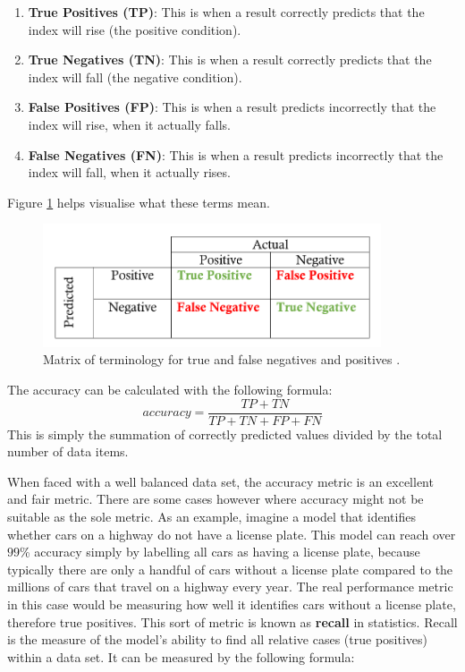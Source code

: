 \documentclass{UoYCSproject}
\begin{document}
\begin{enumerate}
    \item \textbf{True Positives (TP)}: This is when a result correctly predicts that the index will rise (the positive condition).
    \item \textbf{True Negatives (TN)}: This is when a result correctly predicts that the index will fall (the negative condition).
    \item \textbf{False Positives (FP)}: This is when a result predicts incorrectly that the index will rise, when it actually falls.
    \item \textbf{False Negatives (FN)}: This is when a result predicts incorrectly that the index will fall, when it actually rises.
\end{enumerate}

Figure \ref{fig:tptnfpfn} helps visualise what these terms mean.

\begin{figure}[h]
\includegraphics[width=10cm]{tptnfpfn.png}
\centering
\caption{Matrix of terminology for true and false negatives and positives \cite{precisionandrecall}.} 
\label{fig:tptnfpfn}
\end{figure}

The accuracy can be calculated with the following formula: 
\begin{equation}
\label{eq:accuracy}
accuracy=\frac{TP + TN}{TP + TN + FP + FN}
\end{equation}
This is simply the summation of correctly predicted values divided by the total number of data items.

When faced with a well balanced data set, the accuracy metric is an excellent and fair metric. There are some cases however where accuracy might not be suitable as the sole metric. As an example, imagine a model that identifies whether cars on a highway do not have a license plate. This model can reach over $99$\% accuracy simply by labelling all cars as having a license plate, because typically there are only a handful of cars without a license plate compared to the millions of cars that travel on a highway every year. The real performance metric in this case would be measuring how well it identifies cars without a license plate, therefore true positives. This sort of metric is known as \textbf{recall} in statistics. Recall is the measure of the model's ability to find all relative cases (true positives) within a data set. It can be measured by the following formula:
\end{document}

